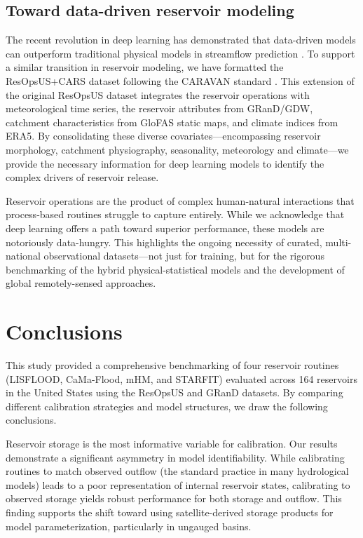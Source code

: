 \documentclass[hess, manuscript]{copernicus}
\begin{document}
\subsection{Toward data-driven reservoir modeling}
\label{sec:data-driven}

The recent revolution in deep learning has demonstrated that data-driven models can outperform traditional physical models in streamflow prediction \citep{Nearing2024}. To support a similar transition in reservoir modeling, we have formatted the ResOpsUS+CARS dataset following the CARAVAN standard \citep{Kratzert2023}. This extension of the original ResOpsUS dataset \citep{Steyaert2022} integrates the reservoir operations with meteorological time series, the reservoir attributes from GRanD/GDW, catchment characteristics from GloFAS static maps, and climate indices from ERA5. By consolidating these diverse covariates—encompassing reservoir morphology, catchment physiography, seasonality, meteorology and climate—we provide the necessary information for deep learning models to identify the complex drivers of reservoir release.  

Reservoir operations are the product of complex human-natural interactions that process-based routines struggle to capture entirely. While we acknowledge that deep learning offers a path toward superior performance, these models are notoriously data-hungry. This highlights the ongoing necessity of curated, multi-national observational datasets—not just for training, but for the rigorous benchmarking of the hybrid physical-statistical models and the development of global remotely-sensed approaches.


\section{Conclusions}
\label{sec:conclusions}

This study provided a comprehensive benchmarking of four reservoir routines (LISFLOOD, CaMa-Flood, mHM, and STARFIT) evaluated across 164 reservoirs in the United States using the ResOpsUS and GRanD datasets. By comparing different calibration strategies and model structures, we draw the following conclusions.

Reservoir storage is the most informative variable for calibration. Our results demonstrate a significant asymmetry in model identifiability. While calibrating routines to match observed outflow (the standard practice in many hydrological models) leads to a poor representation of internal reservoir states, calibrating to observed storage yields robust performance for both storage and outflow. This finding supports the shift toward using satellite-derived storage products for model parameterization, particularly in ungauged basins.
\end{document}
